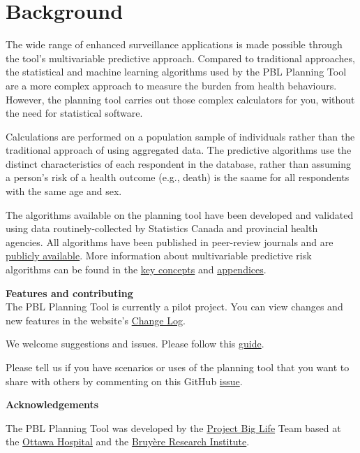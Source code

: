 \documentclass[]{book}
\begin{document}
\hypertarget{background}{\chapter{Background}\label{background}}

The wide range of enhanced surveillance applications is made possible
through the tool's multivariable predictive approach. Compared to
traditional approaches, the statistical and machine learning algorithms
used by the PBL Planning Tool are a more complex approach to measure the
burden from health behaviours.\citep{manuel2018} However, the planning
tool carries out those complex calculators for you, without the need for
statistical software.

Calculations are performed on a population sample of individuals rather
than the traditional approach of using aggregated data. The predictive
algorithms use the distinct characteristics of each respondent in the
database, rather than assuming a person's risk of a health outcome
(e.g., death) is the saame for all respondents with the same age and
sex.

The algorithms available on the planning tool have been developed and
validated using data routinely-collected by Statistics Canada and
provincial health agencies. All algorithms have been published in
peer-review journals and are
\href{https://github.com/Big-Life-Lab/predictive-algorithms}{publicly
available}. More information about multivariable predictive risk
algorithms can be found in the \protect\hyperlink{keyconcepts}{key
concepts} and \protect\hyperlink{mport}{appendices}.

\textbf{Features and contributing}\\
The PBL Planning Tool is currently a pilot project. You can view changes
and new features in the website's
\href{http://planning.projectbiglife.ca/}{Change Log}.

We welcome suggestions and issues. Please follow this
\href{https://github.com/Big-Life-Lab/PBL-Planning-Tool-Guidance/blob/master/contributing/CONTRIBUTING.md}{guide}.

Please tell us if you have scenarios or uses of the planning tool that
you want to share with others by commenting on this GitHub
\href{https://github.com/Big-Life-Lab/PBL-Planning-Tool-Guidance/issues/9}{issue}.

\textbf{Acknowledgements}

The PBL Planning Tool was developed by the
\href{https://www.projectbiglife.ca}{Project Big Life} Team based at the
\href{http://www.ohri.ca/home.asp}{Ottawa Hospital} and the
\href{https://www.bruyere.org/en/bruyere-research-institute}{Bruyère
Research Institute}.
\end{document}
